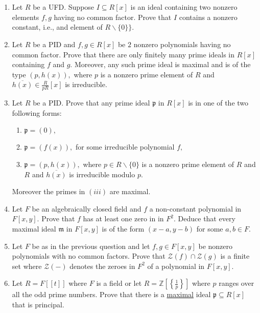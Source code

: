 \documentclass[]{article}
\begin{document}
\section{}
\begin{enumerate}
	\item Let $R$ be a UFD. Suppose $I \subseteq R[x]$ is an ideal containing two nonzero elements $f,g$ having no common factor. Prove that $I$ contains a nonzero constant, i.e., and element of $R\backslash \{0\}\}.$
	\item Let $R$ be a PID and $f,g \in R[x]$ be $2$ nonzero polynomials having no common factor. Prove that there are only finitely many prime ideals in $R[x]$ containing $f$ and $g$. Moreover, any such prime ideal is maximal and is of the type $(p,h(x)),$ where $p$ is a nonzero prime element of $R$ and $\overline{h(x)} \in \frac{R}{pR}[x]$ is irreducible.
	
	\item Let $R$ be a PID. Prove that any prime ideal $\mathfrak{p}$  in $R[x]$ is in one of the two following forms: 
	\begin{enumerate}
		\item $\mathfrak{p}=(0),$
		\item $\mathfrak{p}=(f(x)),$ for some irreducible polynomial $f,$
		\item $\mathfrak{p}=(p,h(x)),$ where $p \in R\backslash \{0\}$ is a nonzero prime element of $R$ and $R$ and $\overline{h(x)}$ is irreducible modulo $p.$
	\end{enumerate}
	Moreover the primes in $(iii)$ are maximal.
	\item Let $F$ be an algebraically closed field and $f$ a non-constant polynomial in $F[x,y].$ Prove that $f$ has at least one zero in in $F^2.$ Deduce that every maximal ideal $\mathfrak{m}$ in $F[x,y]$ is of the form $(x-a,y-b)$ for some $a,b \in F.$ 
	
	\item Let $F$ be as in the previous question and let $f,g \in F[x,y]$ be nonzero polynomials with no common factors. Prove that $\mathcal{Z}(f) \cap \mathcal{Z}(g)$ is a finite set where $\mathcal{Z}(-)$ denotes the zeroes in $F^2$ of a polynomial in $F[x,y]$.
	
	\item Let $R=F[[t]]$ where $F$ is a field or let $R=\mathbb{Z}\left[ \left\{ \frac{1}{p} \right\} \right]$ where $p$ ranges over all the odd prime numbers. Prove that there is a \underline{maximal} ideal $\mathfrak{p} \subseteq R[x]$ that is principal.  
\end{enumerate}
\end{document}
